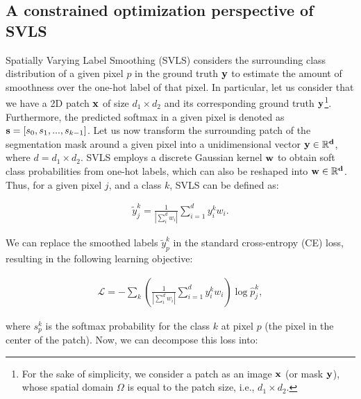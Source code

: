 \documentclass[twocolumn,final,10pt]{elsarticle}
\begin{document}
\subsection{A constrained optimization perspective of SVLS}
\label{ssec:SVLS}

Spatially Varying Label Smoothing (SVLS) \citep{islam2021spatially} considers the surrounding class distribution of a given pixel $p$ in the ground truth $\mathbf{y}$ to estimate the amount of smoothness over the one-hot label of that pixel. In particular, let us consider that we have a 2D patch $\bf{x}$ of size $d_1 \times d_2$ and its corresponding ground truth $\bf{y}$\footnote{For the sake of simplicity, we consider a patch as an image $\mathbf{x}$ (or mask $\mathbf{y}$), whose spatial domain $\Omega$ is equal to the patch size, i.e., $d_1 \times d_2$.}. Furthermore, the predicted softmax in a given pixel is denoted as ${\mathbf{s}}=[s_0,s_1,...,s_{k-1}]$. %
Let us now transform the surrounding patch of the segmentation mask around a given pixel %
into a unidimensional vector $\bf{y} \in \mathbb{R}^d$, where $d=d_1 \times d_2$. SVLS employs a discrete Gaussian kernel $\bf{w}$ to obtain soft class probabilities from one-hot labels, which can also be reshaped into $\bf{w} \in \mathbb{R}^d$. %
Thus, for a given pixel $j$, and a class $k$, SVLS \cite{islam2021spatially} can be defined as:

\begin{align}
\label{eq:svls}
\tilde{y}^k_j = \frac{1}{| \sum_i^d w_i |} \sum_{i=1}^d y^k_i w_i .
\end{align}

We can replace the smoothed labels $\tilde{y}^k_p$ in the standard cross-entropy (CE) loss, resulting in the following learning objective:

\begin{align}
\label{eq:svls-ce}
\mathcal{L} %
= - \sum_k \left(\frac{1}{|  \sum_i^d w_i |}  \sum_{i=1}^d y^k_i w_i \right) \log \hat{p}^k_j ,
\end{align}

where $s^k_p$ is the softmax probability for the class $k$ at pixel $p$ (the pixel in the center of the patch). Now, we can decompose this loss into:
\end{document}

